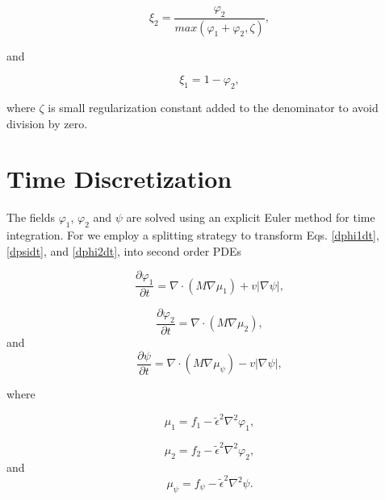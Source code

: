 \documentclass[11pt]{article}
\begin{document}
\begin{equation} \label{xi_2}
\xi_{2} = \frac{\varphi_{2}}{max\left(\varphi_1 + \varphi_2,\zeta\right)},
\end{equation}

and

\begin{equation} \label{xi_1}
\xi_{1} = 1- \varphi_2,
\end{equation}

where $\zeta$ is small regularization constant  added to the denominator to avoid division by zero.

\bigskip
\section{Time Discretization}

The fields $\varphi_1$, $\varphi_2$ and $\psi$ are solved using an explicit Euler method for time integration. For we employ a splitting strategy to transform Eqs. \eqref{dphi1dt}, \eqref{dpsidt}, and \eqref{dphi2dt}, into second order PDEs

\begin{equation} \label{dphi1dt_split}
\frac{\partial \varphi_1}{\partial t} = \nabla \cdot \left(M\nabla\mu_1 \right)+v\big|\nabla \psi \big|,
\end{equation}

\begin{equation} \label{dphi2dt_split}
\frac{\partial\varphi_2}{\partial t}=\nabla \cdot \left(M\nabla\mu_2 \right),
\end{equation}
and
\begin{equation} \label{dpsidt_split}
\frac{\partial \psi}{\partial t} = \nabla \cdot \left(M\nabla\mu_{\psi} \right)-v\big|\nabla \psi \big|,
\end{equation}

where 

\begin{equation} \label{mu_phi1}
\mu_{1}=f_1-\widetilde{\epsilon}^2\nabla^2\varphi_{1},
\end{equation}

\begin{equation} \label{mu_phi2}
\mu_{2}=f_2-\widetilde{\epsilon}^2\nabla^2\varphi_{2},
\end{equation}
and
\begin{equation} \label{mu_psi}
\mu_{\psi}=f_{\psi}-\widetilde{\epsilon}^2\nabla^2\psi.
\end{equation}
\end{document}
